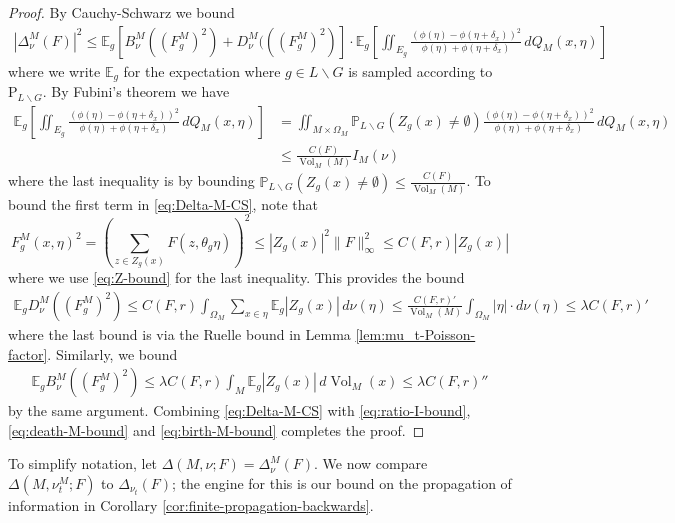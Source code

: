 \documentclass[11pt]{amsart}
\theoremstyle{definition}
\theoremstyle{remark}
\newcommand{\EE}{\mathbb{E}}
\newcommand{\PP}{\mathrm{P}}
\newcommand{\Vol}{\operatorname{Vol}}
\renewcommand{\P}{\mathbb{P}}
\begin{document}
\begin{proof}
	By Cauchy-Schwarz we bound \begin{align}\label{eq:Delta-M-CS}
		|\Delta_{\nu}^M(F)|^2 \leq \EE_{g}\left[B_\nu^M((F_g^M)^2) + D_\nu^M(((F_g^M)^2)\right] \cdot \EE_g\left[ \iint_{E_g} \frac{(\phi(\eta) - \phi(\eta + \delta_x))^2}{\phi(\eta) + \phi(\eta + \delta_x)} \,dQ_M(x,\eta) \right]
	\end{align}
where we write $\EE_g$ for the expectation where $g \in L \backslash G$ is sampled according to $\PP_{L \backslash G}$.
	By Fubini's theorem we have \begin{align}
	\EE_{g}\left[ \iint_{E_g} \frac{(\phi(\eta) - \phi(\eta + \delta_x))^2}{\phi(\eta) + \phi(\eta + \delta_x)} \,dQ_M(x,\eta) \right] &= \iint_{M \times \Omega_M} \P_{L \backslash G}(Z_g(x) \neq \emptyset)  \frac{(\phi(\eta) - \phi(\eta + \delta_x))^2}{\phi(\eta) + \phi(\eta + \delta_x)} \,dQ_M(x,\eta) \nonumber \\
	&\leq \frac{C(F)}{\Vol_M(M)}I_M(\nu) \label{eq:ratio-I-bound}
	\end{align}
where the last inequality is by bounding $\P_{L \backslash G}(Z_g(x) \neq \emptyset) \leq \frac{C(F)}{\Vol_M(M)}$.    To bound the first term in \eqref{eq:Delta-M-CS}, note that \begin{equation*}
	F_g^M(x,\eta)^2 = \left(\sum_{z \in Z_g(x)} F(z,\theta_g \eta)\right)^2 \leq |Z_g(x)|^2 \|F\|_\infty^2 \leq C(F,r) |Z_g(x)| 
\end{equation*}
where we use \eqref{eq:Z-bound} for the last inequality.  This provides the bound \begin{align}\label{eq:death-M-bound}
	\EE_g  D_\nu^M((F_g^M)^2) \leq C(F,r) \int_{\Omega_M}\sum_{x \in \eta} \EE_g |Z_g(x)| \,d\nu(\eta) \leq   \frac{ C(F,r)'}{\Vol_M(M)}\int_{\Omega_M} |\eta| \cdot d\nu(\eta) \leq \lambda C(F,r)'
\end{align}
where the last bound is via the Ruelle bound in Lemma \ref{lem:mu_t-Poisson-factor}.  Similarly, we bound \begin{align}\label{eq:birth-M-bound}
	\EE_g B_\nu^M((F_g^M)^2) \leq \lambda C(F,r) \int_M \EE_g |Z_g(x)| \,d\Vol_M(x) \leq \lambda C(F,r)''
\end{align}
by the same argument.  Combining \eqref{eq:Delta-M-CS} with \eqref{eq:ratio-I-bound}, \eqref{eq:death-M-bound} and \eqref{eq:birth-M-bound} completes the proof.	
\end{proof}


To simplify notation, let $\Delta(M,\nu;F) = \Delta^M_\nu(F)$. We now compare $\Delta(M,\nu_t^M;F)$ to $\Delta_{\nu_t}(F)$; the engine for this is our bound on the propagation of information in Corollary \ref{cor:finite-propagation-backwards}.  
\end{document}
